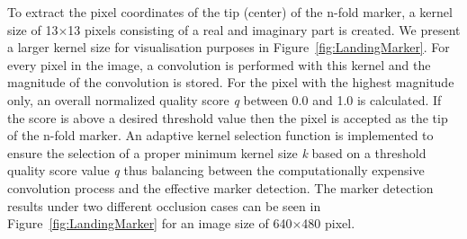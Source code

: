 \documentclass[conference]{IEEEtran}
\begin{document}
To extract the pixel coordinates of the tip (center) of the n-fold marker, a
kernel size of \SI{13}{}$\times$\SI{13}{} pixels consisting of a real and imaginary
part is created. We present a larger kernel size for visualisation purposes in Figure~\ref{fig:LandingMarker}.   For every pixel in the image, a convolution is
performed with this kernel and the magnitude of the convolution is
stored. 
For the pixel with the highest magnitude only, 
an
overall normalized quality score \emph{q} between \SI{0.0}{} and \SI{1.0}{} is calculated. If
the score is above a desired threshold value then the pixel is
accepted as the tip of the n-fold marker. 
%
An adaptive kernel selection function is implemented to ensure the selection of a
proper minimum kernel size \emph{k} based on a threshold quality score value \emph{q} thus balancing between the computationally expensive convolution process and the effective marker detection. The marker detection results under two different occlusion cases can be seen in Figure~\ref{fig:LandingMarker} for an image size of \SI{640}{}$\times$\SI{480}{} pixel.



\end{document}
